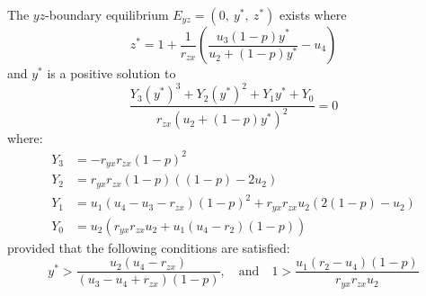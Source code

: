 \begin{theorem}\label{thm:boundary-yz-exist}
    The $yz$-boundary equilibrium $E_{yz}=\left(0,\ y^*,\ z^*\right)$ exists where
    \begin{equation*}
        z^*=1+\frac{1}{r_{zx}}\left(\frac{u_3\left(1-p\right)y^*}{u_2+\left(1-p\right)y^*}-u_4\right)
    \end{equation*}
    and $y^*$ is a positive solution to 
    \begin{equation}\label{eq:yz-Y-vars}
        \frac{Y_3\left(y^*\right)^3+Y_2\left(y^*\right)^2+Y_1y^*+Y_0}{r_{zx}\left(u_2+\left(1-p\right)y^*\right)^2}=0
    \end{equation}
    where:
    \begin{align*}
        Y_3 &= -r_{yx}r_{zx}\left(1-p\right)^2\\
        Y_2 &= r_{yx}r_{zx}\left(1-p\right)\left(\left(1-p\right)-2u_2\right)\\
        Y_1 &= u_1\left(u_4-u_3-r_{zx}\right)\left(1-p\right)^2+r_{yx}r_{zx}u_2\left(2\left(1-p\right)-u_2\right)\\
        Y_0 &= u_2\left(r_{yx}r_{zx}u_2+u_1\left(u_4-r_2\right)\left(1-p\right)\right)
    \end{align*}
    provided that the following conditions are satisfied:
    \begin{equation*}
        y^* > \frac{u_2\left(u_4-r_{zx}\right)}{\left(u_3-u_4+r_{zx}\right)\left(1-p\right)},\quad \text{and} \quad 1 > \frac{u_1\left(r_2-u_4\right)\left(1-p\right)}{r_{yx}r_{zx}u_2}
    \end{equation*}
\end{theorem}
